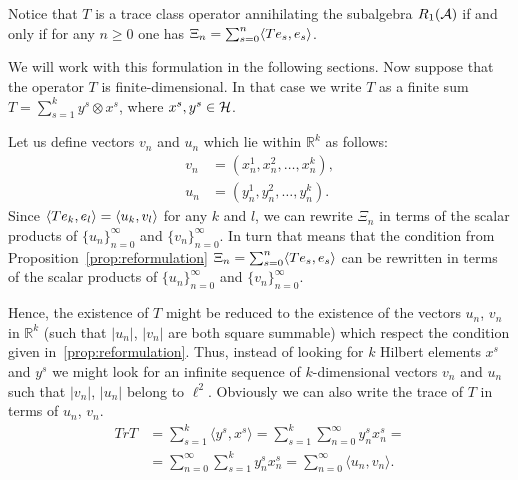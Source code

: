 \documentclass[12pt]{amsart}
\theoremstyle{case}
\begin{document}
  \begin{prop}
    \label{prop:reformulation}
    Notice that $T$ is a trace class operator annihilating the subalgebra $R_1(\cal{A})$ if and only if
      for any $n \geq 0$ one has $\Xi_n = \sum_{s=0}^n \inner{Te_s}{e_s}$.
  \end{prop}
    We will work with this formulation in the following sections.
  Now suppose that the operator $T$ is finite-dimensional.
  In that case we write $T$ as a finite sum $T = \sum_{s=1}^k y^s \otimes x^s$,
    where $x^s, y^s \in \cal{H}$.

  Let us define vectors $v_n$ and $u_n$ which lie within $\mathbb{R}^k$ as follows:
  \begin{align*}
    v_n &= (x^1_n, x^2_n, \dots, x^k_n),\\
    u_n &= (y^1_n, y^2_n, \dots, y^k_n).
  \end{align*}
  Since $\inner{Te_k}{e_l} = \inner{u_k}{v_l}$ for any $k$ and $l$, we can rewrite $\Xi_n$ in terms of
    the scalar products of $\{u_n\}_{n=0}^\infty$ and $\{v_n\}_{n=0}^\infty$.
  In turn that means that the condition from Proposition~\ref{prop:reformulation} $\Xi_n = \sum_{s=0}^n \inner{Te_s}{e_s}$
    can be rewritten in terms of the scalar products of $\{u_n\}_{n=0}^\infty$ and $\{v_n\}_{n=0}^\infty$.

  Hence, the existence of $T$ might be reduced to the existence of
    the vectors $u_n$, $v_n$ in $\mathbb{R}^k$ (such that $\lvert u_n\rvert$, $\lvert v_n\rvert$ are both square summable)
    which respect the condition given in~\ref{prop:reformulation}.
  Thus, instead of looking for $k$ Hilbert elements $x^s$ and $y^s$ we might look for an infinite sequence
    of $k$-dimensional vectors $v_n$ and $u_n$ such that $\lvert v_n \rvert$, $\lvert u_n \rvert$ belong to $\ell^2$.
  Obviously we can also write the trace of $T$ in terms of $u_n$, $v_n$.
  \begin{align*}
    Tr T &= \sum_{s=1}^k \langle y^s, x^s \rangle = \sum_{s=1}^k \sum_{n=0}^\infty y^s_n x^s_n =\\
         &= \sum_{n=0}^\infty \sum_{s=1}^k y^s_n x^s_n = \sum_{n=0}^\infty \langle u_n, v_n \rangle.
  \end{align*}
\end{document}
